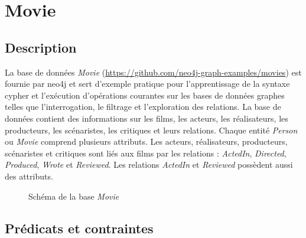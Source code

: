 \section{Movie}

\subsection{Description}

La base de données \emph{Movie} (\url{https://github.com/neo4j-graph-examples/movies}) est fournie par \gls{neo4j} et sert d'exemple pratique pour l'apprentissage de la syntaxe \gls{cypher} et l'exécution d'opérations courantes sur les bases de données graphes telles que l'interrogation, le filtrage et l'exploration des relations.
La base de données contient des informations sur les films, les acteurs, les réalisateurs, les producteurs, les scénaristes, les critiques et leurs relations.
Chaque entité \emph{Person} ou \emph{Movie} comprend plusieurs attributs.
Les acteurs, réalisateurs, producteurs, scénaristes et critiques sont liés aux films par les relations : \emph{ActedIn}, \emph{Directed}, \emph{Produced}, \emph{Wrote} et  \emph{Reviewed}.
Les relations \emph{ActedIn} et \emph{Reviewed} possèdent aussi des attributs.

\begin{figure}[H]
    \centering
    \begin{adjustbox}{max width=.8\linewidth, max height=.5\textheight}
    \end{adjustbox}
    \caption{Schéma de la base \emph{Movie}}
\end{figure}

\subsection{Prédicats et contraintes}

